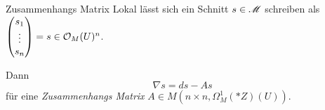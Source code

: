 \begin{frame}[t]{Zusammenhangs Matrix}
  Lokal lässt sich ein Schnitt $s\in\mathscr{M}$ schreiben als
  $\begin{pmatrix}s_{1}\\\vdots\\s_{n}\end{pmatrix}=s\in\mathcal{O}_M(U)^n$.
  \begin{lemdef}
    Dann
    \[
      \nabla s=ds-As
    \]
    für eine \emph{Zusammenhangs Matrix}
    $A\in M\left(n\!\times\! n,\Omega_M^1(*Z)(U)\right)$.
  \end{lemdef}
\end{frame}

